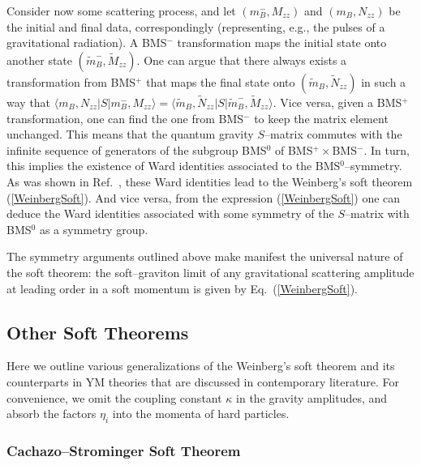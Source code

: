 \documentclass[11pt,a4paper]{article}
\begin{document}
Consider now some scattering process, and let $(m_B^-,M_{zz})$ and $(m_B,N_{zz})$ be the initial and final data, correspondingly (representing, e.g., the pulses of a gravitational radiation).
A BMS$^-$ transformation maps the initial state onto another state $(\tilde{m}_B^-,\tilde{M}_{zz})$. One can argue that there always exists a transformation from BMS$^+$ that maps the final state onto $(\tilde{m}_B,\tilde{N}_{zz})$ in such a way that $\langle m_B,N_{zz}\vert S\vert m_B^-,M_{zz}\rangle=\langle \tilde{m}_B,\tilde{N}_{zz}\vert S\vert \tilde{m}_B^-,\tilde{M}_{zz}\rangle$.
Vice versa, given a BMS$^+$ transformation, one can find the one from BMS$^-$ to keep the matrix element unchanged. This means that the quantum gravity $S$--matrix commutes with the infinite sequence of generators of the subgroup BMS$^0$ of BMS$^+\times$BMS$^-$. In turn, this implies the existence of Ward identities associated to the BMS$^0$--symmetry. As was shown in Ref.~\cite{He:2014laa}, these Ward identities lead to the Weinberg's soft theorem (\ref{WeinbergSoft}). And vice versa, from the expression (\ref{WeinbergSoft}) one can deduce the Ward identities associated with some symmetry of the $S$--matrix with BMS$^0$ as a symmetry group.

The symmetry arguments outlined above make manifest the universal nature of the soft theorem: the soft--graviton limit of any gravitational scattering amplitude at leading order in a soft momentum is given by Eq.~(\ref{WeinbergSoft}).

\subsection{Other Soft Theorems}

Here we outline various generalizations of the Weinberg's soft theorem and its counterparts in YM theories that are discussed in contemporary literature. For convenience, we omit the coupling constant $\kappa$ in the gravity amplitudes, and absorb the factors $\eta_i$ into the momenta of hard particles.

\subsubsection{Cachazo--Strominger Soft Theorem}
\end{document}
